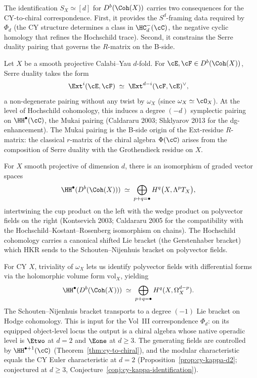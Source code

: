 The identification $S_X \simeq [d]$ for $D^b(\Coh(X))$ carries two consequences for the CY-to-chiral correspondence. First, it provides the $S^d$-framing data required by $\Phi_d$ (the CY structure determines a class in $\HC^-_d(\cC)$, the negative cyclic homology that refines the Hochschild trace). Second, it constrains the Serre duality pairing that governs the $R$-matrix on the B-side.

\begin{proposition}
\label{prop:serre-duality-cy}
Let $X$ be a smooth projective Calabi--Yau $d$-fold. For $\cE, \cF \in D^b(\Coh(X))$, Serre duality takes the form
\[
 \Ext^i(\cE, \cF) \;\simeq\; \Ext^{d-i}(\cF, \cE)^\vee,
\]
a non-degenerate pairing without any twist by $\omega_X$ (since $\omega_X \simeq \cO_X$). At the level of Hochschild cohomology, this induces a degree $(-d)$ symplectic pairing on $\HH^\bullet(\cC)$, the Mukai pairing (Caldararu 2003; Shklyarov 2013 for the dg-enhancement). The Mukai pairing is the B-side origin of the Ext-residue $R$-matrix: the classical $r$-matrix of the chiral algebra $\Phi(\cC)$ arises from the composition of Serre duality with the Grothendieck residue on $X$.
\end{proposition}

\begin{theorem}
\label{thm:hkr-cy}
For $X$ smooth projective of dimension $d$, there is an isomorphism of graded vector spaces
\[
 \HH^\bullet(D^b(\Coh(X))) \;\simeq\; \bigoplus_{p+q = \bullet} H^q\bigl(X, \Lambda^p T_X\bigr),
\]
intertwining the cup product on the left with the wedge product on polyvector fields on the right (Kontsevich 2003; Caldararu 2005 for the compatibility with the Hochschild--Kostant--Rosenberg isomorphism on chains). The Hochschild cohomology carries a canonical shifted Lie bracket (the Gerstenhaber bracket) which HKR sends to the Schouten--Nijenhuis bracket on polyvector fields.
\end{theorem}

For CY $X$, triviality of $\omega_X$ lets us identify polyvector fields with differential forms via the holomorphic volume form $\mathrm{vol}_X$, yielding
\[
 \HH^\bullet(D^b(\Coh(X))) \;\simeq\; \bigoplus_{p+q = \bullet} H^q(X, \Omega^{d-p}_X).
\]
The Schouten--Nijenhuis bracket transports to a degree $(-1)$ Lie bracket on Hodge cohomology. This is input for the Vol~III correspondence $\Phi_d$: on its equipped object-level locus the output is a chiral algebra whose native operadic level is $\Etwo$ at $d=2$ and $\Eone$ at $d\geq3$. The generating fields are controlled by $\HH^{\bullet+1}(\cC)$ (Theorem~\ref{thm:cy-to-chiral}), and the modular characteristic equals the CY Euler characteristic at $d = 2$ (Proposition~\ref{prop:cy-kappa-d2}; conjectured at $d \geq 3$, Conjecture~\ref{conj:cy-kappa-identification}).

